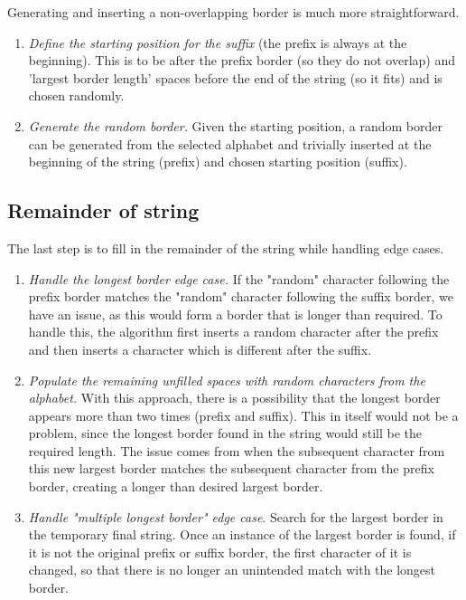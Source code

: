 \documentclass{l4proj}
\begin{document}
Generating and inserting a non-overlapping border is much more straightforward. 
\begin{enumerate}[i]
	\item
	\emph{Define the starting position for the suffix} (the prefix is always at the beginning). This is to be after the prefix border (so they do not overlap) and 'largest border length' spaces before the end of the string (so it fits) and is chosen randomly. 
	\item
	\emph{Generate the random border.} Given the starting position, a random border can be generated from the selected alphabet and trivially inserted at the beginning of the string (prefix) and chosen starting position (suffix). 
\end{enumerate}

\subsection{Remainder of string}
\label{sec:remainder}

The last step is to fill in the remainder of the string while handling edge cases.

\begin{enumerate}[i]
	\item
	\emph{Handle the longest border edge case.}  If the "random" character following the prefix border matches the "random" character following the suffix border, we have an issue, as this would form a border that is longer than required. To handle this, the algorithm first inserts a random character after the prefix and then inserts a character which is different after the suffix.

	\item
	\emph{Populate the remaining unfilled spaces with random characters from the alphabet.} With this approach, there is a possibility that the longest border appears more than two times (prefix and suffix). This in itself would not be a problem, since the longest border found in the string would still be the required length. The issue comes from when the subsequent character from this new largest border matches the subsequent character from the prefix border, creating a longer than desired largest border.

	\item
	\emph{Handle "multiple longest border" edge case}. Search for the largest border in the temporary final string. Once an instance of the largest border is found, if it is not the original prefix or suffix border, the first character of it is changed, so that there is no longer an unintended match with the longest border.
\end{enumerate}
\end{document}
